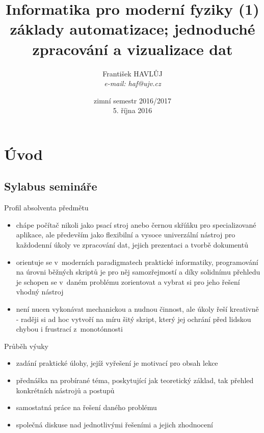 \documentclass{beamer}
\title[IMF (1)]{Informatika pro moderní fyziky (1)\\základy automatizace; jednoduché zpracování a vizualizace dat}
\author[Franti\v{s}ek HAVL\r{U}J, ORF ÚJV Řež]{Franti\v{s}ek HAVL\r{U}J\\{\scriptsize \emph{e-mail: haf@ujv.cz}}}
\date{zimní semestr 2016/2017\\5. října 2016}
\institute[ORF ÚJV Řež]
{ÚJV Řež\\oddělení Reaktorové fyziky a podpory palivového cyklu}
\begin{document}
\begin{frame}
  \titlepage
\end{frame}

\begin{frame}
  \tableofcontents
\end{frame}

\section{Úvod}

\subsection{Sylabus semináře}

\begin{frame}{Profil absolventa předmětu}
  \begin{itemize}
    \item chápe počítač nikoli jako psací stroj anebo černou skříňku pro specializované aplikace, ale především jako flexibilní a vysoce univerzální nástroj pro každodenní úkoly ve zpracování dat, jejich prezentaci a tvorbě dokumentů
    \item orientuje se v~moderních paradigmatech praktické informatiky, programování na úrovni běžných skriptů je pro něj samozřejmostí a díky solidnímu přehledu je schopen se v~daném problému zorientovat a vybrat si pro jeho řešení vhodný nástroj
    \item není nucen vykonávat mechanickou a nudnou činnost, ale úkoly řeší kreativně - raději si ad hoc vytvoří na míru šitý skript, který jej ochrání před lidskou chybou i frustrací z~monotónnosti
  \end{itemize}
\end{frame}

\begin{frame}{Průběh výuky}
  \begin{itemize}
    \item zadání praktické úlohy, jejíž vyřešení je motivací pro obsah lekce
    \item přednáška na probírané téma, poskytující jak teoretický základ, tak přehled konkrétních nástrojů a postupů
    \item samostatná práce na řešení daného problému
    \item společná diskuse nad jednotlivými řešeními a jejich zhodnocení
  \end{itemize}
\end{frame}
\end{document}
